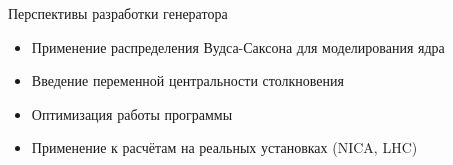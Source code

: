 \documentclass[aspectratio=43]{beamer}
\begin{document}
\begin{frame}{Перспективы разработки генератора}

	\begin{itemize}[<+- | alert@+>]
		\item Применение распределения Вудса-Саксона для моделирования ядра
		\item Введение переменной центральности столкновения
		\item Оптимизация работы программы
		\item Применение к расчётам на реальных установках (NICA, LHC)
	\end{itemize}

\end{frame}
\end{document}
